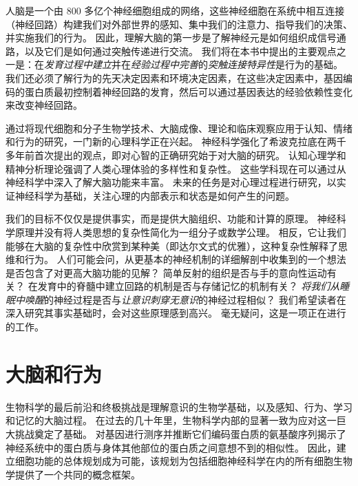 人脑是一个由 800 多亿个神经细胞组成的网络，这些神经细胞在系统中相互连接（神经回路）构建我们对外部世界的感知、集中我们的注意力、指导我们的决策、并实施我们的行为。
因此，理解大脑的第一步是了解神经元是如何组织成信号通路，以及它们是如何通过突触传递进行交流。
我们将在本书中提出的主要观点之一是：在\textit{发育过程中建立}并在\textit{经验过程中完善}的\textit{突触连接特异性}是行为的基础。
我们还必须了解行为的先天决定因素和环境决定因素，在这些决定因素中，基因编码的蛋白质最初控制着神经回路的发育，然后可以通过基因表达的经验依赖性变化来改变神经回路。


通过将现代细胞和分子生物学技术、大脑成像、理论和临床观察应用于认知、情绪和行为的研究，一门新的心理科学正在兴起。
神经科学强化了希波克拉底在两千多年前首次提出的观点，即对心智的正确研究始于对大脑的研究。
认知心理学和精神分析理论强调了人类心理体验的多样性和复杂性。
这些学科现在可以通过从神经科学中深入了解大脑功能来丰富。
未来的任务是对心理过程进行研究，以实证神经科学为基础，关注心理的内部表示和状态是如何产生的问题。


我们的目标不仅仅是提供事实，而是提供大脑组织、功能和计算的原理。
神经科学原理并没有将人类思想的复杂性简化为一组分子或数学公理。
相反，它让我们能够在大脑的复杂性中欣赏到某种美（即达尔文式的优雅），这种复杂性解释了思维和行为。
人们可能会问，从更基本的神经机制的详细解剖中收集到的一个想法是否包含了对更高大脑功能的见解？
简单反射的组织是否与手的意向性运动有关？
在发育中的脊髓中建立回路的机制是否与存储记忆的机制有关？
\textit{将我们从睡眠中唤醒}的神经过程是否与\textit{让意识刺穿无意识}的神经过程相似？
我们希望读者在深入研究其事实基础时，会对这些原理感到高兴。
毫无疑问，这是一项正在进行的工作。





\chapter{大脑和行为} \label{chap:chap1}
生物科学的最后前沿和终极挑战是理解意识的生物学基础，以及感知、行为、学习和记忆的大脑过程。
在过去的几十年里，生物科学内部的显著一致为应对这一巨大挑战奠定了基础。
对基因进行测序并推断它们编码蛋白质的氨基酸序列揭示了神经系统中的蛋白质与身体其他部位的蛋白质之间意想不到的相似性。 
因此，建立细胞功能的总体规划成为可能，该规划为包括细胞神经科学在内的所有细胞生物学提供了一个共同的概念框架。


